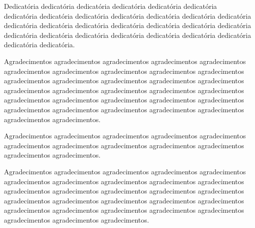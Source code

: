 
\begin{dedicatoria}

    Dedicatória dedicatória dedicatória dedicatória dedicatória
    dedicatória dedicatória dedicatória dedicatória dedicatória
    dedicatória dedicatória dedicatória dedicatória dedicatória
    dedicatória dedicatória dedicatória dedicatória dedicatória
    dedicatória dedicatória dedicatória dedicatória dedicatória
    dedicatória dedicatória dedicatória dedicatória.

\end{dedicatoria}


\begin{agradecimentos}

    Agradecimentos agradecimentos agradecimentos agradecimentos
    agradecimentos agradecimentos agradecimentos agradecimentos
    agradecimentos agradecimentos agradecimentos agradecimentos
    agradecimentos agradecimentos agradecimentos agradecimentos
    agradecimentos agradecimentos agradecimentos agradecimentos
    agradecimentos agradecimentos agradecimentos agradecimentos
    agradecimentos agradecimentos agradecimentos agradecimentos
    agradecimentos agradecimentos agradecimentos agradecimentos.

    Agradecimentos agradecimentos agradecimentos agradecimentos
    agradecimentos agradecimentos agradecimentos agradecimentos
    agradecimentos agradecimentos agradecimentos agradecimentos.

    Agradecimentos agradecimentos agradecimentos agradecimentos
    agradecimentos agradecimentos agradecimentos agradecimentos
    agradecimentos agradecimentos agradecimentos agradecimentos
    agradecimentos agradecimentos agradecimentos agradecimentos
    agradecimentos agradecimentos agradecimentos agradecimentos
    agradecimentos agradecimentos agradecimentos agradecimentos
    agradecimentos agradecimentos agradecimentos agradecimentos.

\end{agradecimentos}



